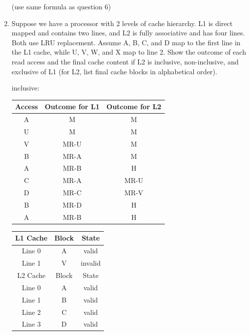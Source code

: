 \documentclass[12pt]{article}
\begin{document}
\begin{enumerate}
        (use same formula as question 6)

        \item Suppose we have a processor with 2 levels of cache hierarchy. L1 is direct mapped and contains two lines, 
        and L2 is fully associative and has four lines. Both use LRU replacement. Assume 
        A, B, C, and D map to the first line in the L1 cache, while U, V, W, and X map to line 2. Show the outcome of 
        each read access  and the final cache content if L2 is inclusive, non-inclusive, and exclusive of L1 (for L2, 
        list final cache blocks in alphabetical order).

        inclusive:

        \begin{tabular}[ht!]{|c|c|c|} \hline
            Access  & Outcome for L1    & Outcome for L2    \\ \hline
            A       & M                 & M                 \\ \hline
            U       & M                 & M                 \\ \hline
            V       & MR-U              & M                 \\ \hline
            B       & MR-A              & M                 \\ \hline
            A       & MR-B              & H                 \\ \hline
            C       & MR-A              & MR-U              \\ \hline
            D       & MR-C              & MR-V              \\ \hline
            B       & MR-D              & H                 \\ \hline
            A       & MR-B              & H                 \\ \hline            
        \end{tabular}

        \begin{tabular}[ht!]{|c|c|c|} \hline
            L1 Cache    & Block & State     \\ \hline
            Line 0      & A     & valid     \\ \hline
            Line 1      & V     & invalid   \\ \hline
            L2 Cache    & Block & State     \\ \hline
            Line 0      & A     & valid     \\ \hline
            Line 1      & B     & valid     \\ \hline
            Line 2      & C     & valid     \\ \hline
            Line 3      & D     & valid     \\ \hline
        \end{tabular}


\end{enumerate}
\end{document}
